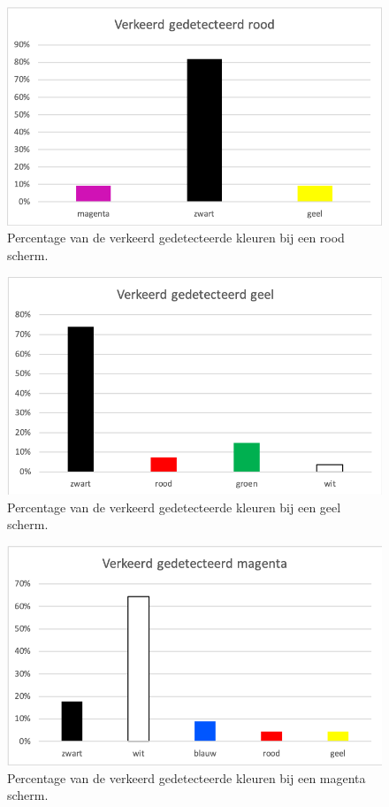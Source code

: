 \documentclass[a4paper,11pt]{article}
\begin{document}
	\bigskip		
		\begin{figure} [H]
			\center
			\includegraphics{img/WrongRed}
			\caption{Percentage van de verkeerd gedetecteerde kleuren bij een rood scherm.}
		\end{figure}
	\bigskip		
		\begin{figure} [H]
			\center
			\includegraphics{img/WrongYellow}
			\caption{Percentage van de verkeerd gedetecteerde kleuren bij een geel scherm.}
		\end{figure}
	\bigskip		
		\begin{figure} [H]
			\center
			\includegraphics{img/WrongPurple}
			\caption{Percentage van de verkeerd gedetecteerde kleuren bij een magenta scherm.}
		\end{figure}
\end{document}
